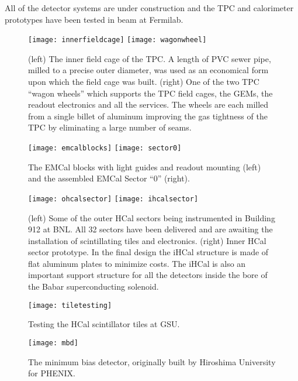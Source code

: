 All of the detector systems are under construction and the TPC and
calorimeter prototypes have been tested in beam at Fermilab.

\begin{figure}[hbt!]
  \centering
  \texttt{[image: innerfieldcage]}
  \hfill
  \texttt{[image: wagonwheel]}
  \caption{(left) The inner field cage of the TPC. A length of PVC
    sewer pipe, milled to a precise outer diameter, was used as an
    economical form upon which the field cage was built.  (right) One
    of the two TPC ``wagon wheels'' which supports the TPC field
    cages, the GEMs, the readout electronics and all the services.
    The wheels are each milled from a single billet of aluminum
    improving the gas tightness of the TPC by eliminating a large
    number of seams.}
  \label{fig:wagonwheel}
\end{figure}

\begin{figure}[hbt!]
  \centering
  \texttt{[image: emcalblocks]}
  \hfill
  \texttt{[image: sector0]}
  \caption{The EMCal blocks with light guides and readout mounting
    (left) and the assembled EMCal Sector ``0'' (right).}
  \label{fig:emcal}
\end{figure}

\begin{figure}[hbt!]
  \centering
  \texttt{[image: ohcalsector]}
  \hfill
  \texttt{[image: ihcalsector]}
  \caption{(left) Some of the outer HCal sectors being instrumented in
    Building 912 at BNL.  All 32 sectors have been delivered and are
    awaiting the installation of scintillating tiles and
    electronics. (right) Inner HCal sector prototype. In the final
    design the iHCal structure is made of flat aluminum plates to
    minimize costs. The iHCal is also an important support structure
    for all the detectors inside the bore of the Babar superconducting
    solenoid.}
  \label{fig:hcal}
\end{figure}

\begin{figure}[hbt!]
  \centering
  \texttt{[image: tiletesting]}
  \caption{Testing the HCal scintillator tiles at GSU.}
  \label{fig:tiletesting}
\end{figure}

\begin{figure}[hbt!]
  \centering
  \texttt{[image: mbd]}
  \caption{The minimum bias detector, originally built by Hiroshima
    University for PHENIX.}
  \label{fig:mbd}
\end{figure}

